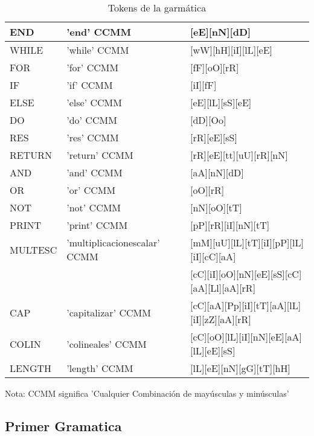 \begin{table}[!htb]
\begin{center}
\begin{tabular}{| l | l | l |}
\hline
END & 'end' CCMM & [eE][nN][dD] \\
\hline
WHILE & 'while' CCMM & [wW][hH][iI][lL][eE] \\
\hline
FOR & 'for' CCMM & [fF][oO][rR] \\
\hline
IF & 'if' CCMM & [iI][fF] \\
\hline
ELSE & 'else' CCMM & [eE][lL][sS][eE] \\
\hline
DO & 'do' CCMM & [dD][Oo] \\
\hline
RES & 'res' CCMM & [rR][eE][sS] \\
\hline
RETURN & 'return' CCMM & [rR][eE][tt][uU][rR][nN] \\
\hline
AND & 'and' CCMM & [aA][nN][dD] \\
\hline
OR & 'or' CCMM & [oO][rR] \\
\hline
NOT 	& 'not' CCMM & [nN][oO][tT] \\
\hline
PRINT & 'print' CCMM & [pP][rR][iI][nN][tT] \\
\hline
MULTESC & 'multiplicacionescalar' CCMM & [mM][uU][lL][tT][iI][pP][lL][iI][cC][aA] \\
 & & [cC][iI][oO][nN][eE][sS][cC][aA][Ll][aA][rR] \\
\hline
CAP & 'capitalizar' CCMM & [cC][aA][Pp][iI][tT][aA][lL][iI][zZ][aA][rR] \\
\hline
COLIN & 'colineales' CCMM & [cC][oO][lL][iI][nN][eE][aA][lL][eE][sS] \\
\hline
LENGTH & 'length' CCMM & [lL][eE][nN][gG][tT][hH] \\
\hline

\end{tabular}
\end{center}
\caption{Tokens de la garmática}\label{tab-tokens}
\end{table}


Nota: CCMM significa 'Cualquier Combinación de mayúsculas y minúsculas'

\newpage

\subsection{Primer Gramatica}


